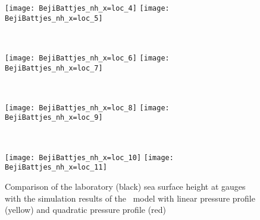 \begin{figure}[htbp]
\begin{minipage}{\textwidth}
\texttt{[image: BejiBattjes\_nh\_x=loc\_4]}
\texttt{[image: BejiBattjes\_nh\_x=loc\_5]}
\end{minipage} \\
\begin{minipage}{\textwidth}
\texttt{[image: BejiBattjes\_nh\_x=loc\_6]}
\texttt{[image: BejiBattjes\_nh\_x=loc\_7]}
\end{minipage} \\
\begin{minipage}{\textwidth}
\texttt{[image: BejiBattjes\_nh\_x=loc\_8]}
\texttt{[image: BejiBattjes\_nh\_x=loc\_9]}
\end{minipage} \\
\begin{minipage}{\textwidth}
\texttt{[image: BejiBattjes\_nh\_x=loc\_10]}
\texttt{[image: BejiBattjes\_nh\_x=loc\_11]}
\end{minipage}
\caption{Comparison of the laboratory (black) sea surface height at gauges with the simulation results of the \nh\ model with linear pressure profile (yellow) and quadratic pressure profile (red)}
\label{fig:nh_bejjibattjes_nh}
\end{figure}